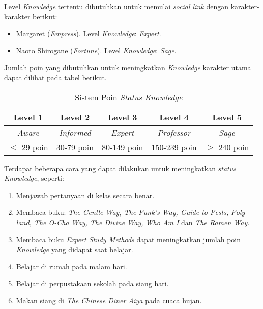 Level \textit{Knowledge} tertentu dibutuhkan untuk memulai \textit{social link} dengan karakter-karakter berikut:
\begin{itemize}
    \item Margaret (\textit{Empress}). Level \textit{Knowledge}: \textit{Expert}.
    \item Naoto Shirogane (\textit{Fortune}). Level \textit{Knowledge}: \textit{Sage}.
\end{itemize}

Jumlah poin yang dibutuhkan untuk meningkatkan \textit{Knowledge} karakter utama dapat dilihat pada tabel berikut.
\begin{table}[htb]
    \begin{center}
        \begin{tabular}{ | c | c | c | c | c | }
            \hline
            Level 1        & Level 2           & Level 3         & Level 4            & Level 5        \\
            \hline
            \textit{Aware} & \textit{Informed} & \textit{Expert} & \textit{Professor} & \textit{Sage}  \\
            \hline
            $\le$ 29 poin  & 30-79 poin        & 80-149 poin     & 150-239 poin       & $\ge$ 240 poin \\
            \hline
        \end{tabular}
    \end{center}
    \caption{Sistem Poin \textit{Status Knowledge}}
\end{table}

Terdapat beberapa cara yang dapat dilakukan untuk meningkatkan \textit{status Knowledge}, seperti:
\begin{enumerate}
    \item Menjawab pertanyaan di kelas secara benar. %
    \item Membaca buku: \textit{The Gentle Way, The Punk’s Way, Guide to Pests, Poly-land, The O-Cha Way, The Divine Way, Who Am I} dan \textit{The Ramen Way}. %
    \item Membaca buku \textit{Expert Study Methods} dapat meningkatkan jumlah poin \textit{Knowledge} yang didapat saat belajar.
    \item Belajar di rumah pada malam hari. %
    \item Belajar di perpustakaan sekolah pada siang hari.  %
    \item Makan siang di \textit{The Chinese Diner Aiya} pada cuaca hujan.
\end{enumerate}

